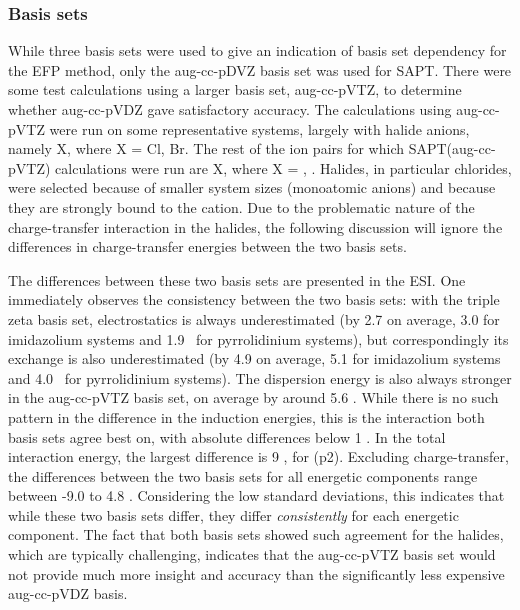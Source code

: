 \subsubsection{Basis sets}
While three basis sets were used to give an indication of basis set dependency for the EFP method, only the aug-cc-pDVZ basis set was used for SAPT. 
There were some test calculations using a larger basis set, aug-cc-pVTZ, to determine whether aug-cc-pVDZ gave satisfactory accuracy.
The calculations using aug-cc-pVTZ were run on some representative systems, largely with halide anions, namely X, where X = Cl, Br.
The rest of the ion pairs for which SAPT(aug-cc-pVTZ) calculations were run are X, where X = \bfl, \cl.
Halides, in particular chlorides, were selected because of smaller system sizes (monoatomic anions) and because they are strongly bound to the cation. 
Due to the problematic nature of the charge-transfer interaction in the halides, the following discussion will ignore the differences in charge-transfer energies between the two basis sets.


The differences between these two basis sets are presented in the ESI.
One immediately observes the consistency between the two basis sets: with the triple zeta basis set, electrostatics is always underestimated (by 2.7 \enUnit on average, 3.0 for imidazolium systems and 1.9 \enUnit~for pyrrolidinium systems), but correspondingly its exchange is also underestimated (by 4.9 \enUnit on average, 5.1 for imidazolium systems and 4.0 \enUnit~for pyrrolidinium systems).
The dispersion energy is also always stronger in the aug-cc-pVTZ basis set, on average by around 5.6 \enUnit.
While there is no such pattern in the difference in the induction energies, this is the interaction both basis sets agree best on, with absolute differences below 1 \enUnit.
In the total interaction energy, the largest difference is 9 \enUnit, for  (p2).
Excluding charge-transfer, the differences between the two basis sets for all energetic components range between -9.0 to 4.8 \enUnit.
Considering the low standard deviations, this indicates that while these two basis sets differ, they differ \emph{consistently} for each energetic component. 
The fact that both basis sets showed such agreement for the halides, which are typically challenging, indicates that the aug-cc-pVTZ basis set would not provide much more insight and accuracy than the significantly less expensive aug-cc-pVDZ basis.


